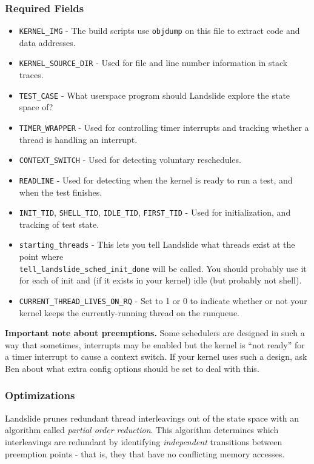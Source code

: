 \documentclass{article}
\begin{document}
\subsubsection{Required Fields}
\begin{itemize}
	\item \texttt{KERNEL\_IMG} - The build scripts use \texttt{objdump} on this file to extract code and data addresses.
	\item \texttt{KERNEL\_SOURCE\_DIR} - Used for file and line number information in stack traces.
	\item \texttt{TEST\_CASE} - What userspace program should Landslide explore the state space of?
	\item \texttt{TIMER\_WRAPPER} - Used for controlling timer interrupts and tracking whether a thread is handling an interrupt.
	\item \texttt{CONTEXT\_SWITCH} - Used for detecting voluntary reschedules.
	\item \texttt{READLINE} - Used for detecting when the kernel is ready to run a test, and when the test finishes.
	\item \texttt{INIT\_TID}, \texttt{SHELL\_TID}, \texttt{IDLE\_TID}, \texttt{FIRST\_TID} - Used for initialization, and tracking of test state.
	\item \texttt{starting\_threads} - This lets you tell Landslide what threads exist at the point where \\ \texttt{tell\_landslide\_sched\_init\_done} will be called. You should probably use it for each of init and (if it exists in your kernel) idle (but probably not shell).
	\item \texttt{CURRENT\_THREAD\_LIVES\_ON\_RQ} - Set to 1 or 0 to indicate whether or not your kernel keeps the currently-running thread on the runqueue.
\end{itemize}

{\bf Important note about preemptions.} Some schedulers are designed in such a way that sometimes, interrupts may be enabled but the kernel is ``not ready'' for a timer interrupt to cause a context switch. If your kernel uses such a design, ask Ben about what extra config options should be set to deal with this.

\subsubsection{Optimizations}

Landslide prunes redundant thread interleavings out of the state space with an algorithm called {\em partial order reduction}. This algorithm determines which interleavings are redundant by identifying
{\em independent} transitions between preemption points - that is, they that have no conflicting memory accesses.
\end{document}
